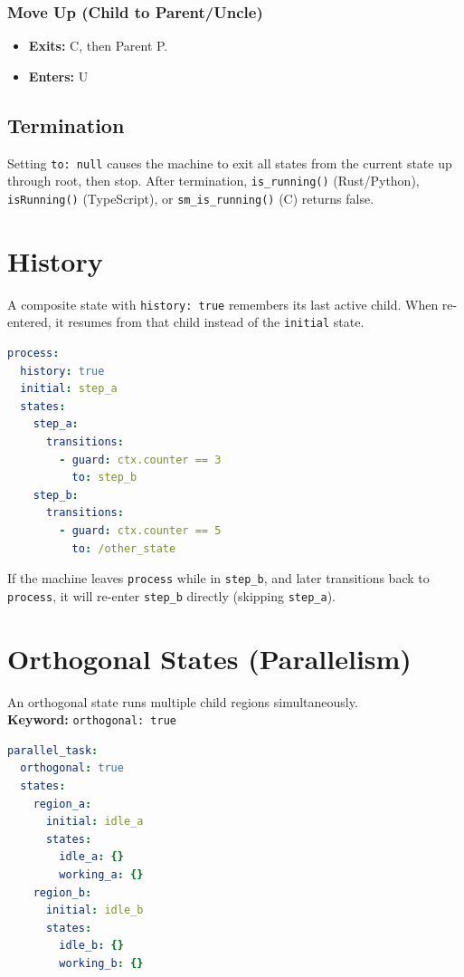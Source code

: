 \documentclass[a4paper,11pt]{article}
\begin{document}
\subsubsection*{Move Up (Child to Parent/Uncle)}
\begin{itemize}
    \item \textbf{Exits:} C, then Parent P.
    \item \textbf{Enters:} U
\end{itemize}

\subsection{Termination}
Setting \texttt{to: null} causes the machine to exit all states from the current state up through root, then stop. After termination, \texttt{is\_running()} (Rust/Python), \texttt{isRunning()} (TypeScript), or \texttt{sm\_is\_running()} (C) returns false.

\section{History}
A composite state with \texttt{history: true} remembers its last active child. When re-entered, it resumes from that child instead of the \texttt{initial} state.

\begin{lstlisting}[language=YAML, caption={History example}]
process:
  history: true
  initial: step_a
  states:
    step_a:
      transitions:
        - guard: ctx.counter == 3
          to: step_b
    step_b:
      transitions:
        - guard: ctx.counter == 5
          to: /other_state
\end{lstlisting}

If the machine leaves \texttt{process} while in \texttt{step\_b}, and later transitions back to \texttt{process}, it will re-enter \texttt{step\_b} directly (skipping \texttt{step\_a}).

\section{Orthogonal States (Parallelism)}
\label{sec:orthogonal}
An orthogonal state runs multiple child regions simultaneously.\\
\textbf{Keyword:} \texttt{orthogonal: true}

\begin{lstlisting}[language=YAML, caption={Orthogonal state definition}]
parallel_task:
  orthogonal: true
  states:
    region_a:
      initial: idle_a
      states:
        idle_a: {}
        working_a: {}
    region_b:
      initial: idle_b
      states:
        idle_b: {}
        working_b: {}
\end{lstlisting}
\end{document}
